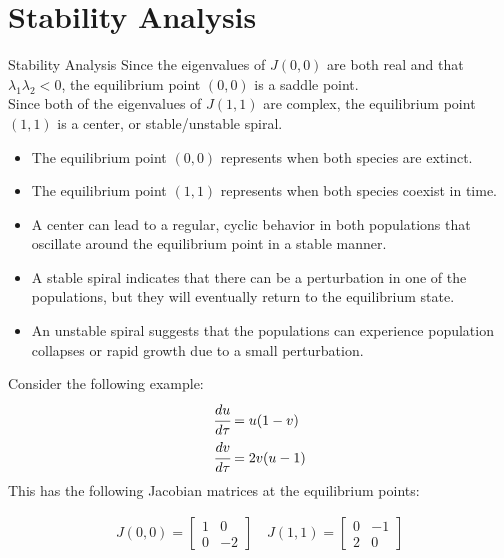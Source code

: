 \documentclass[10pt]{beamer}
\begin{document}
\section{Stability Analysis}
\begin{frame}{Stability Analysis}
    Since the eigenvalues of $J(0, 0)$ are both real and that $\lambda_1
        \lambda_2 < 0$, the equilibrium point $(0, 0)$ is a saddle point.
    \\
    Since both of the eigenvalues of $J(1, 1)$ are complex, the equilibrium
    point $(1, 1)$ is a center, or stable/unstable spiral.

    \begin{itemize}
        \item The equilibrium point $(0, 0)$ represents when both species are extinct.
        \item The equilibrium point $(1, 1)$ represents when both species coexist in time.
        \item A center can lead to a regular, cyclic behavior in both populations that oscillate around the equilibrium point in a stable manner.
        \item A stable spiral indicates that there can be a perturbation in one of the populations, but they will eventually return to the equilibrium state.
        \item An unstable spiral suggests that the populations can experience population collapses or rapid growth due to a small perturbation.
    \end{itemize}
\end{frame}

\begin{frame}
    Consider the following example:
    \begin{align*}
        \cfrac{du}{d\tau} & = u(1 - v) \\
        \cfrac{dv}{d\tau} & = 2v(u-1)
    \end{align*}
    This has the following Jacobian matrices at the equilibrium points:

    \begin{align*}
        J(0, 0) = \begin{bmatrix}
                      1 & 0  \\
                      0 & -2
                  \end{bmatrix}
        \quad
        J(1, 1) = \begin{bmatrix}
                      0 & -1 \\
                      2 & 0
                  \end{bmatrix}
    \end{align*}
\end{frame}
\end{document}

